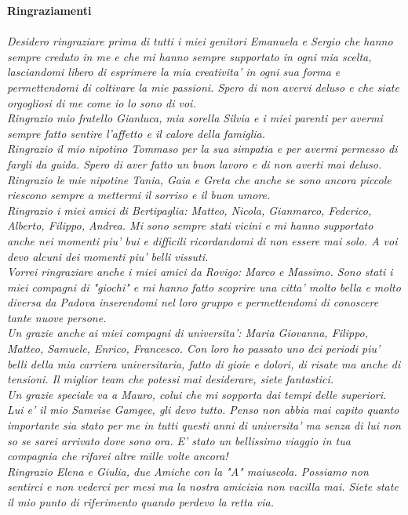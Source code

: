 \thispagestyle{empty}
\textbf{Ringraziamenti}\\\\
\textit{
Desidero ringraziare prima di tutti i miei genitori Emanuela e Sergio che hanno sempre creduto in me e che mi hanno sempre supportato in ogni mia scelta, lasciandomi libero di esprimere la mia creativita' in ogni sua forma e permettendomi di coltivare la mie passioni. Spero di non avervi deluso e che siate orgogliosi di me come io lo sono di voi.
\\
Ringrazio mio fratello Gianluca, mia sorella Silvia e i miei parenti per avermi sempre fatto sentire l'affetto e il calore della famiglia.
\\
Ringrazio il mio nipotino Tommaso per la sua simpatia e per avermi permesso di fargli da guida. Spero di aver fatto un buon lavoro e di non averti mai deluso. Ringrazio le mie nipotine Tania, Gaia e Greta che anche se sono ancora piccole riescono sempre a mettermi il sorriso e il buon umore.
\\
Ringrazio i miei amici di Bertipaglia: Matteo, Nicola, Gianmarco, Federico, Alberto, Filippo, Andrea. Mi sono sempre stati vicini e mi hanno supportato anche nei momenti piu' bui e difficili ricordandomi di non essere mai solo. A voi devo alcuni dei momenti piu' belli vissuti.
\\
Vorrei ringraziare anche i miei amici da Rovigo: Marco e Massimo. Sono stati i miei compagni di "giochi" e mi hanno fatto scoprire una citta' molto bella e molto diversa da Padova inserendomi nel loro gruppo e permettendomi di conoscere tante nuove persone.
\\
Un grazie anche ai miei compagni di universita': Maria Giovanna, Filippo, Matteo, Samuele, Enrico, Francesco. Con loro ho passato uno dei periodi piu' belli della mia carriera universitaria, fatto di gioie e dolori, di risate ma anche di tensioni. Il miglior team che potessi mai desiderare, siete fantastici.
\\
Un grazie speciale va a Mauro, colui che mi sopporta dai tempi delle superiori. Lui e' il mio Samvise Gamgee, gli devo tutto. Penso non abbia mai capito quanto importante sia stato per me in tutti questi anni di universita' ma senza di lui non so se sarei arrivato dove sono ora. E' stato un bellissimo viaggio in tua compagnia che rifarei altre mille volte ancora!
\\
Ringrazio Elena e Giulia, due Amiche con la "A" maiuscola. Possiamo non sentirci e non vederci per mesi ma la nostra amicizia non vacilla mai. Siete state il mio punto di riferimento quando perdevo la retta via.
}
